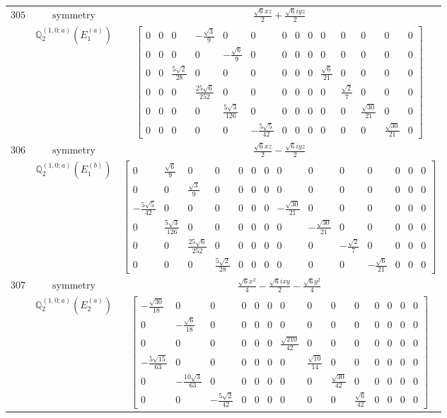 \documentclass[fleqn,8pt,landscape]{jsarticle}
\begin{document}
\begin{longtable}{ccc}
$ 305 $ & $ \text{symmetry} $ & $ \frac{\sqrt{6} x z}{2} + \frac{\sqrt{6} i y z}{2} $ \\
$  $ & $ \mathbb{Q}_{2}^{(1,0;a)}(E_{1}^{(a)}) $ & $ \begin{bmatrix} 0 & 0 & 0 & - \frac{\sqrt{3}}{9} & 0 & 0 & 0 & 0 & 0 & 0 & 0 & 0 & 0 & 0 \\ 0 & 0 & 0 & 0 & - \frac{\sqrt{6}}{9} & 0 & 0 & 0 & 0 & 0 & 0 & 0 & 0 & 0 \\ 0 & 0 & \frac{5 \sqrt{2}}{28} & 0 & 0 & 0 & 0 & 0 & 0 & \frac{\sqrt{6}}{21} & 0 & 0 & 0 & 0 \\ 0 & 0 & 0 & \frac{25 \sqrt{6}}{252} & 0 & 0 & 0 & 0 & 0 & 0 & \frac{\sqrt{2}}{7} & 0 & 0 & 0 \\ 0 & 0 & 0 & 0 & \frac{5 \sqrt{3}}{126} & 0 & 0 & 0 & 0 & 0 & 0 & \frac{\sqrt{30}}{21} & 0 & 0 \\ 0 & 0 & 0 & 0 & 0 & - \frac{5 \sqrt{5}}{42} & 0 & 0 & 0 & 0 & 0 & 0 & \frac{\sqrt{30}}{21} & 0 \end{bmatrix} $ \\ \hline
$ 306 $ & $ \text{symmetry} $ & $ \frac{\sqrt{6} x z}{2} - \frac{\sqrt{6} i y z}{2} $ \\
$  $ & $ \mathbb{Q}_{2}^{(1,0;a)}(E_{1}^{(b)}) $ & $ \begin{bmatrix} 0 & \frac{\sqrt{6}}{9} & 0 & 0 & 0 & 0 & 0 & 0 & 0 & 0 & 0 & 0 & 0 & 0 \\ 0 & 0 & \frac{\sqrt{3}}{9} & 0 & 0 & 0 & 0 & 0 & 0 & 0 & 0 & 0 & 0 & 0 \\ - \frac{5 \sqrt{5}}{42} & 0 & 0 & 0 & 0 & 0 & 0 & - \frac{\sqrt{30}}{21} & 0 & 0 & 0 & 0 & 0 & 0 \\ 0 & \frac{5 \sqrt{3}}{126} & 0 & 0 & 0 & 0 & 0 & 0 & - \frac{\sqrt{30}}{21} & 0 & 0 & 0 & 0 & 0 \\ 0 & 0 & \frac{25 \sqrt{6}}{252} & 0 & 0 & 0 & 0 & 0 & 0 & - \frac{\sqrt{2}}{7} & 0 & 0 & 0 & 0 \\ 0 & 0 & 0 & \frac{5 \sqrt{2}}{28} & 0 & 0 & 0 & 0 & 0 & 0 & - \frac{\sqrt{6}}{21} & 0 & 0 & 0 \end{bmatrix} $ \\ \hline
$ 307 $ & $ \text{symmetry} $ & $ \frac{\sqrt{6} x^{2}}{4} - \frac{\sqrt{6} i x y}{2} - \frac{\sqrt{6} y^{2}}{4} $ \\
$  $ & $ \mathbb{Q}_{2}^{(1,0;a)}(E_{2}^{(a)}) $ & $ \begin{bmatrix} - \frac{\sqrt{30}}{18} & 0 & 0 & 0 & 0 & 0 & 0 & 0 & 0 & 0 & 0 & 0 & 0 & 0 \\ 0 & - \frac{\sqrt{6}}{18} & 0 & 0 & 0 & 0 & 0 & 0 & 0 & 0 & 0 & 0 & 0 & 0 \\ 0 & 0 & 0 & 0 & 0 & 0 & \frac{\sqrt{210}}{42} & 0 & 0 & 0 & 0 & 0 & 0 & 0 \\ - \frac{5 \sqrt{15}}{63} & 0 & 0 & 0 & 0 & 0 & 0 & \frac{\sqrt{10}}{14} & 0 & 0 & 0 & 0 & 0 & 0 \\ 0 & - \frac{10 \sqrt{3}}{63} & 0 & 0 & 0 & 0 & 0 & 0 & \frac{\sqrt{30}}{42} & 0 & 0 & 0 & 0 & 0 \\ 0 & 0 & - \frac{5 \sqrt{2}}{42} & 0 & 0 & 0 & 0 & 0 & 0 & \frac{\sqrt{6}}{42} & 0 & 0 & 0 & 0 \end{bmatrix} $ \\ \hline

\end{longtable}
\end{document}
